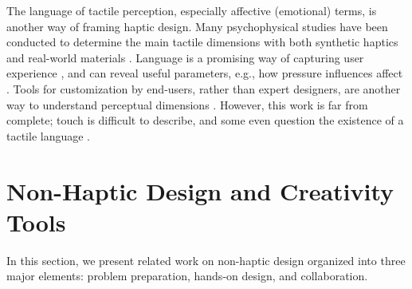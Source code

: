 The language of tactile perception, especially affective (emotional) terms, is another way of framing haptic design.
Many psychophysical studies have been conducted to determine the main tactile dimensions with both synthetic haptics and real-world materials  \cite{Enriquez2003,Okamoto2013}.
Language is a promising way of capturing user experience \cite{Obrist2013}, and can reveal useful parameters, e.g., how pressure influences affect \cite{Zheng2012}.
Tools for customization by end-users, rather than expert designers, are another way to understand perceptual dimensions \cite{Seifi2014, Seifi2015}.
However, this work is far from complete; touch is difficult to describe, and some even question the existence of a tactile language \cite{Jansson-Boyd2011}.



%
%
\section{Non-Haptic Design and Creativity Tools}

In this section, we present related work on non-haptic design organized into three major elements: problem preparation, hands-on design, and collaboration.

